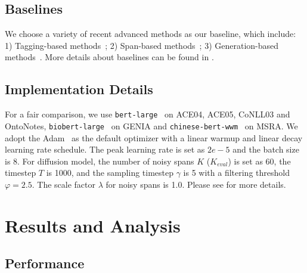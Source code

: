 \documentclass[11pt]{article}
\begin{document}
\subsection{Baselines}

 
We choose a variety of recent advanced methods as our baseline, which include: 1) Tagging-based methods~\citep{strakova-etal-2019-neural, ju-etal-2018-neural, wang-etal-2020-pyramid}; 2) Span-based methods~\citep{yu-etal-2020-named, li-etal-2020-unified, wan-etal-2022-nested, lou-etal-2022-nested, zhu-li-2022-boundary, yuan-etal-2022-fusing}; 3) Generation-based methods~\citep{ijcai2021-542, yan-etal-2021-unified-generative, lu-etal-2022-unified}. More details about baselines can be found in .

\subsection{Implementation Details}
For a fair comparison, we use \texttt{bert-large}~\citep{devlin-etal-2019-bert} on ACE04, ACE05, CoNLL03 and
OntoNotes, \texttt{biobert-large}~\citep{chiu-etal-2016-train} on GENIA and \texttt{chinese-bert-wwm}~\citep{cui-etal-2020-revisiting} on MSRA. We adopt the Adam~\citep{adam} as the default optimizer with a linear warmup and linear decay learning rate schedule. The peak learning rate is set as $2e-5$ and the batch size is 8. For diffusion model, the number of noisy spans $K$ ($K_{eval}$) is set as 60, the timestep $T$ is 1000, and the sampling timestep $\gamma$ is 5 with a filtering threshold $\varphi=2.5$. The scale factor $\lambda$ for noisy spans is 1.0.
Please see  for more details.

\section{Results and Analysis}


\subsection{Performance}
\end{document}
